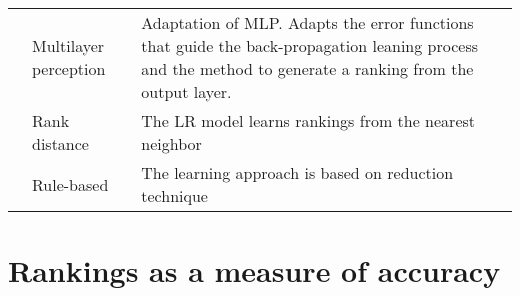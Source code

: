 \documentclass[a4paper,twoside,12pt,openright,notitlepage]{report}\usepackage[]{graphicx}\usepackage[]{color}
\begin{document}
\begin{landscape}
\begin{longtable}{p{6cm}p{4cm}p{6cm}p{4cm}}
& Multilayer perception & Adaptation of MLP. Adapts the error functions that guide the back-propagation leaning process and the method to generate a ranking from the output layer.  &\cite{ribeiro2012} \\
&Rank distance & The LR model learns rankings from the nearest neighbor &\cite{brazdil2003}\\
&Rule-based & The learning approach is based on reduction technique&\cite{gurrieri2012} \\
\bottomrule
\end{longtable}
\end{landscape}
\processdelayedfloats
\cleardoublepage

\chapter{Rankings as a measure of accuracy}
\label{ch3}

%











\end{document}
